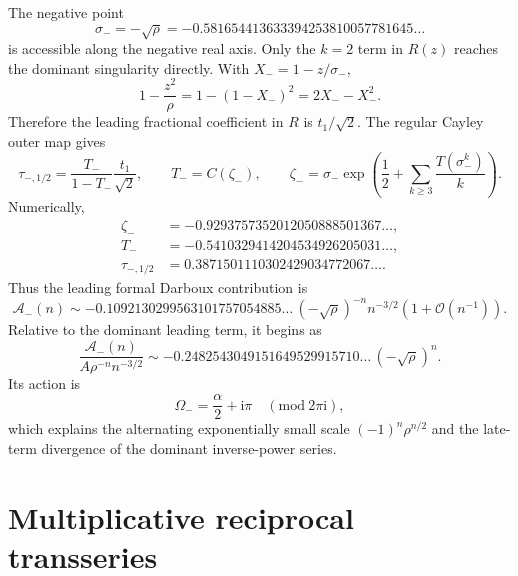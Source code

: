 \documentclass[11pt]{article}
\theoremstyle{definition}
\theoremstyle{remark}
\newcommand{\ii}{\mathrm i}
\newcommand{\BigO}{\mathcal O}
\begin{document}
The negative point
\begin{equation}
 \sigma_-=-\sqrt\rho
 =-0.581654413633394253810057781645\ldots
 \label{eq:sigma-minus}
\end{equation}
is accessible along the negative real axis.  Only the $k=2$ term in $R(z)$
reaches the dominant singularity directly.  With
$X_-=1-z/\sigma_-$,
\[
 1-\frac{z^2}{\rho}=1-(1-X_-)^2=2X_--X_-^2.
\]
Therefore the leading fractional coefficient in $R$ is $t_1/\sqrt2$.
The regular Cayley outer map gives
\begin{equation}
 \tau_{-,1/2}
 =\frac{T_-}{1-T_-}\frac{t_1}{\sqrt2},
 \qquad
 T_-=C(\zeta_-),
 \qquad
 \zeta_-=\sigma_-\exp\!\left(
 \frac12+\sum_{k\geq3}\frac{T(\sigma_-^k)}{k}\right).
 \label{eq:tau-minus}
\end{equation}
Numerically,
\begin{align*}
 \zeta_-&=-0.9293757352012050888501367\ldots,\\
 T_-&=-0.5410329414204534926205031\ldots,\\
 \tau_{-,1/2}&=0.3871501110302429034772067\ldots.
\end{align*}
Thus the leading formal Darboux contribution is
\begin{equation}
 \mathcal A_-(n)
 \sim -0.1092130299563101757054885\ldots\,
       (-\sqrt\rho)^{-n}n^{-3/2}
       \left(1+\BigO(n^{-1})\right).
 \label{eq:first-subdominant}
\end{equation}
Relative to the dominant leading term, it begins as
\begin{equation}
 \frac{\mathcal A_-(n)}{A\rho^{-n}n^{-3/2}}
 \sim -0.2482543049151649529915710\ldots\,
       (-\sqrt\rho)^n.
 \label{eq:first-relative}
\end{equation}
Its action is
\begin{equation}
 \Omega_-=\frac{\alpha}{2}+\ii\pi
 \quad(\mathrm{mod}\ 2\pi\ii),
 \label{eq:minus-action}
\end{equation}
which explains the alternating exponentially small scale
$(-1)^n\rho^{n/2}$ and the late-term divergence of the dominant inverse-power
series.

\section{Multiplicative reciprocal transseries}
\label{sec:reciprocal}
\end{document}
